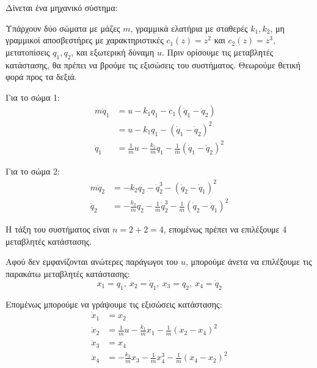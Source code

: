 \documentclass[11pt,a4paper,notitlepage,fleqn]{article}
\let\mytodo\todo
\renewcommand{\todo}[1]{\par\mytodo[inline,noline]{#1}}
\begin{document}
\begin{exercise}
	Δίνεται ένα μηχανικό σύστημα:
	\todo{Graph 32}

	Υπάρχουν δύο σώματα με μάζες \( m \), γραμμικά ελατήρια με σταθερές
	\( k_1,k_2 \), μη γραμμικοί αποσβεστήρες με χαρακτηριστικές
	\( c_1(z) = z^2 \) και \( c_2(z) = z^3 \), μετατοπίσεις
	\( q_1,q_2 \), και εξωτερική δύναμη \( u \).
	\tcblower
	Πριν ορίσουμε τις μεταβλητές κατάστασης, θα πρέπει να βρούμε τις
	εξισώσεις του συστήματος. Θεωρούμε θετική φορά προς τα δεξιά.

	Για το σώμα 1:
	\begin{align*}
		m\ddot q_1 &=
		u - k_1q_1 - c_1(\dot q_1 -\dot q_2)
		\\ &= u-k_1q_1 - (\dot q_1 - \dot q_2)^2 \\
		\ddot q_1 &=
		\frac{1}{m}u - \frac{k_1}{m}q_1 - \frac{1}{m}(\dot q_1 -\dot q_2)^2
	\end{align*}

	Για το σώμα 2:
	\begin{align*}
	m\ddot q_2 &= -k_2q_2 - \dot q_2^3
	- (\dot q_2 - \dot q_1)^2 \\
	\ddot q_2 &= -\frac{k_2}{m}q_2 - \frac{1}{m}\dot q_2^3
	- \frac{1}{m}(\dot q_2 - \dot q_1)^2
	\end{align*}

	Η τάξη του συστήματος είναι \( n=2+2=4 \), επομένως πρέπει να επιλέξουμε 4 μεταβλητές κατάστασης.

	Αφού δεν εμφανίζονται ανώτερες παράγωγοι του \( u \), μπορούμε
	άνετα να επιλέξουμε τις παρακάτω μεταβλητές κατάστασης:
	\[
	x_1=q_1,\ x_2 = \dot q_1,\ x_3 = q_2,\ x_4 = \dot q_2
	\]

	Επομένως μπορούμε να γράψουμε τις εξισώσεις κατάστασης:
	\begin{align*}
		\dot x_1 &= x_2 \\
		\dot x_2 &= \frac{1}{m} u -\frac{k_1}{m}x_1
		-\frac{1}{m}(x_2-x_4)^2 \\
		\dot x_3 &= x_4 \\
		\dot x_4 &= -\frac{k_2}{m}x_3 - \frac{1}{m}x_4^3-\frac{1}{m}(x_4-x_2)^2
	\end{align*}
\end{exercise}
\end{document}
